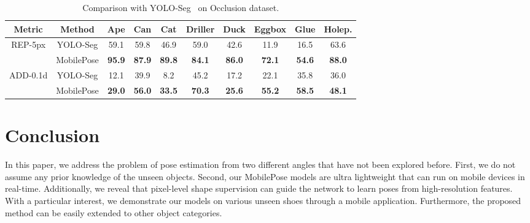\documentclass[runningheads]{llncs}
\begin{document}
\begin{table}[t]
\begin{center}
\vspace{-0.5cm}
\begin{tabular}{c|c||c|c|c|c|c|c|c|c}\hline
Metric & Method & Ape & Can & Cat & Driller & Duck & Eggbox & Glue & Holep.\\
\hline
\multirow{2}{*}{REP-5px} &
YOLO-Seg & 59.1 & 59.8 & 46.9 & 59.0 & 42.6 & 11.9 & 16.5 & 63.6 \\
&MobilePose & \textbf{95.9} & \textbf{87.9} & \textbf{89.8} & \textbf{84.1} & \textbf{86.0} & \textbf{72.1} & \textbf{54.6} & \textbf{88.0}\\
\hline
\multirow{2}{*}{ADD-0.1d} &
YOLO-Seg & 12.1 & 39.9 & 8.2 & 45.2 & 17.2 & 22.1 & 35.8 & 36.0 \\
&MobilePose & \textbf{29.0} & \textbf{56.0} & \textbf{33.5} & \textbf{70.3} & \textbf{25.6} & \textbf{55.2} & \textbf{58.5} & \textbf{48.1} \\
\hline
\end{tabular}
\caption{Comparison with YOLO-Seg~\cite{Hu_2019_Segmentation} on Occlusion dataset.}
\label{tab:occlusion}
\end{center}
\end{table}

\section{Conclusion}
In this paper, we address the problem of pose estimation from two different angles that have not been explored before. First, we do not assume any prior knowledge of the unseen objects. Second, our MobilePose models are ultra lightweight that can run on mobile devices in real-time. Additionally, we reveal that pixel-level shape supervision can guide the network to learn poses from high-resolution features. With a particular interest, we demonstrate our models on various unseen shoes through a mobile application. Furthermore, the proposed method can be easily extended to other object categories.
\end{document}
